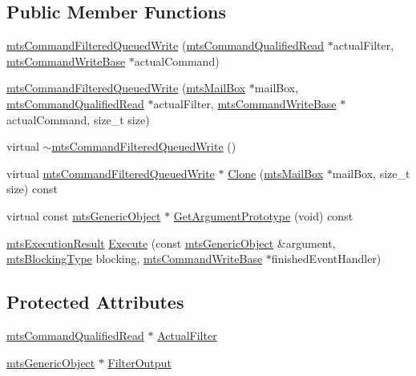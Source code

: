 \subsection*{Public Member Functions}
\begin{DoxyCompactItemize}
\item 
\hyperlink{classmts_command_filtered_queued_write_ab01016fda86f12a553c5b7cb96598d67}{mts\+Command\+Filtered\+Queued\+Write} (\hyperlink{classmts_command_qualified_read}{mts\+Command\+Qualified\+Read} $\ast$actual\+Filter, \hyperlink{classmts_command_write_base}{mts\+Command\+Write\+Base} $\ast$actual\+Command)
\item 
\hyperlink{classmts_command_filtered_queued_write_a0eb986c33def2704bf514fa4b9868ef1}{mts\+Command\+Filtered\+Queued\+Write} (\hyperlink{classmts_mail_box}{mts\+Mail\+Box} $\ast$mail\+Box, \hyperlink{classmts_command_qualified_read}{mts\+Command\+Qualified\+Read} $\ast$actual\+Filter, \hyperlink{classmts_command_write_base}{mts\+Command\+Write\+Base} $\ast$actual\+Command, size\+\_\+t size)
\item 
virtual \hyperlink{classmts_command_filtered_queued_write_a94068246efae390821532312462eda7b}{$\sim$mts\+Command\+Filtered\+Queued\+Write} ()
\item 
virtual \hyperlink{classmts_command_filtered_queued_write}{mts\+Command\+Filtered\+Queued\+Write} $\ast$ \hyperlink{classmts_command_filtered_queued_write_a43b5f03075b7403afec8db6afb7c1e0d}{Clone} (\hyperlink{classmts_mail_box}{mts\+Mail\+Box} $\ast$mail\+Box, size\+\_\+t size) const 
\item 
virtual const \hyperlink{classmts_generic_object}{mts\+Generic\+Object} $\ast$ \hyperlink{classmts_command_filtered_queued_write_a576ba5d70031bcbc36b8243c8c1ee0b3}{Get\+Argument\+Prototype} (void) const 
\item 
\hyperlink{classmts_execution_result}{mts\+Execution\+Result} \hyperlink{classmts_command_filtered_queued_write_aff8888085a9797ea557a097f07dd742b}{Execute} (const \hyperlink{classmts_generic_object}{mts\+Generic\+Object} \&argument, \hyperlink{mts_forward_declarations_8h_ad7426ccb6c883bc780d0ee197dddcbe7}{mts\+Blocking\+Type} blocking, \hyperlink{classmts_command_write_base}{mts\+Command\+Write\+Base} $\ast$finished\+Event\+Handler)
\end{DoxyCompactItemize}
\subsection*{Protected Attributes}
\begin{DoxyCompactItemize}
\item 
\hyperlink{classmts_command_qualified_read}{mts\+Command\+Qualified\+Read} $\ast$ \hyperlink{classmts_command_filtered_queued_write_a718a512e857afbb05d1b4ab6886b57f5}{Actual\+Filter}
\item 
\hyperlink{classmts_generic_object}{mts\+Generic\+Object} $\ast$ \hyperlink{classmts_command_filtered_queued_write_a485105f94a78b6a6ef600c3dbf9140d0}{Filter\+Output}
\end{DoxyCompactItemize}
